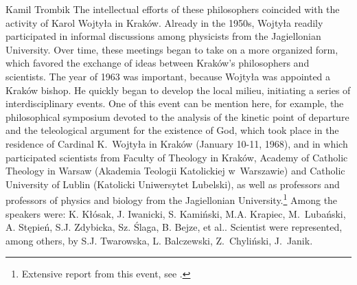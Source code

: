 \begin{artengenv}{Kamil Trombik}
The intellectual efforts of these philosophers coincided with the activity of Karol Wojtyła in Kraków. Already in the
1950s, Wojtyła readily participated in informal discussions among physicists from the Jagiellonian University. Over
time, these meetings began to take on a more organized form, which favored the exchange of ideas between Kraków's
philosophers and scientists. The year of 1963 was important, because Wojtyła was appointed a Kraków bishop. He quickly
began to develop the local milieu, initiating a series of interdisciplinary events. One of this event can be mention
here, for example, the philosophical symposium devoted to the analysis of the kinetic point of departure and the
teleological argument for the existence of God, which took place in the residence of Cardinal K.~Wojtyła in Kraków
(January 10-11, 1968), and in which participated scientists from Faculty of Theology in Kraków, Academy of Catholic
Theology in Warsaw (Akademia Teologii Katolickiej w~Warszawie) and Catholic University of Lublin (Katolicki Uniwersytet
Lubelski), as well as professors and professors of physics and biology from the Jagiellonian
University.\footnote{Extensive report from this event, see
\parencite{morawiec_sympozjum_1968}.
} Among the speakers were: K. Kłósak,
J. Iwanicki, S. Kamiński, M.A. Krapiec, M.~Lubański, A. Stępień, S.J. Zdybicka, Sz. Ślaga, B. Bejze, et al.. Scientist
were represented, among others, by S.J. Twarowska, L. Balczewski, Z.~Chyliński, J.~Janik.


\end{artengenv}
